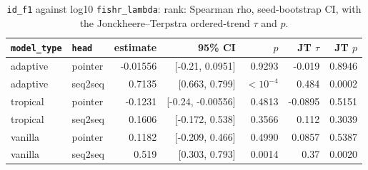 \documentclass[10pt]{article}
\begin{document}
{\small
\begin{longtable}{llrrrrr}
\caption{\texttt{id\_f1} against log10 \texttt{fishr\_lambda}: rank: Spearman rho, seed-bootstrap CI, with the Jonckheere--Terpstra ordered-trend $\tau$ and $p$.}\label{tab:trend-id_f1}\\
\toprule
\texttt{model\_type} & \texttt{head} & estimate & 95\% CI & $p$ & JT $\tau$ & JT $p$\\
\midrule
\endhead
adaptive & pointer & -0.01556 & [-0.21, 0.0951] & 0.9293 & -0.019 & 0.8946\\
adaptive & seq2seq & 0.7135 & [0.663, 0.799] & $<10^{-4}$ & 0.484 & 0.0002\\
tropical & pointer & -0.1231 & [-0.24, -0.00556] & 0.4813 & -0.0895 & 0.5151\\
tropical & seq2seq & 0.1606 & [-0.172, 0.538] & 0.3566 & 0.112 & 0.3039\\
vanilla & pointer & 0.1182 & [-0.209, 0.466] & 0.4990 & 0.0857 & 0.5387\\
vanilla & seq2seq & 0.519 & [0.303, 0.793] & 0.0014 & 0.37 & 0.0020\\
\bottomrule
\end{longtable}
}
\end{document}
